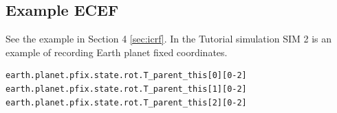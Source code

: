 \subsection{Example ECEF}
See the example in Section 4 \ref{sec:icrf}.
In the Tutorial simulation SIM 2 is an example of recording Earth planet fixed coordinates. 
\begin{verbatim}
earth.planet.pfix.state.rot.T_parent_this[0][0-2]
earth.planet.pfix.state.rot.T_parent_this[1][0-2]
earth.planet.pfix.state.rot.T_parent_this[2][0-2]
\end{verbatim}

